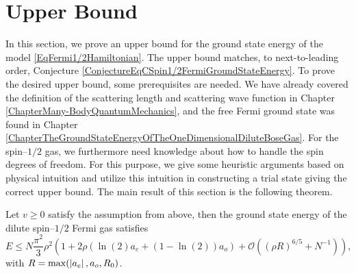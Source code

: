 \section{Upper Bound}
\label{SectionSpin1/2FermiUpperBound}
In this section, we prove an upper bound for the ground state energy of the model \eqref{EqFermi1/2Hamiltonian}. The upper bound matches, to next-to-leading order, Conjecture \ref{ConjectureEqCSpin1/2FermiGroundStateEnergy}.
To prove the desired upper bound, some prerequisites are needed. We have already covered the definition of the scattering length and scattering wave function in Chapter \ref{ChapterMany-BodyQuantumMechanics}, and the free Fermi ground state was found in Chapter \ref{ChapterTheGroundStateEnergyOfTheOneDimensionalDiluteBoseGas}. For the spin--$ 1/2 $ gas, we furthermore need knowledge about how to handle the spin degrees of freedom. For this purpose, we give some heuristic arguments based on physical intuition and utilize this intuition in constructing a trial state giving the correct upper bound. 
The main result of this section is the following theorem.
\begin{theorem}\label{TheoremUpperBoundSpin1/2Fermi}
	Let $ v\geq0 $ satisfy the assumption from above, then the ground state energy of the dilute spin--$ 1/2 $ Fermi gas satisfies\begin{equation}\label{EqUpperBoundSpin1/2Fermi}
	E\leq N\frac{\pi^2}{3}\rho^2\left(1+2\rho \left(\ln(2) a_e+(1-\ln(2))a_o\right)+\mathcal{O}\left((\rho R)^{6/5}+N^{-1}\right)\right),
	\end{equation}
	with $ R=\max(\left\lvert a_e \right\rvert, a_o, R_0) $.
\end{theorem}
